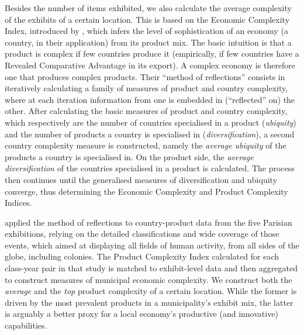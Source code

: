 Besides the number of items exhibited, we also calculate the average complexity of the exhibits of a certain location. 
This is based on the Economic Complexity Index, introduced by \cite{hidalgo2009}, which infers the level of sophistication of an economy (a country, in their application) from its product mix. 
The basic intuition is that a product is complex if few countries produce it (empirically, if few countries have a Revealed Comparative Advantage in its export). 
A complex economy is therefore one that produces complex products. 
Their ``method of reflections'' consists in iteratively calculating a family of measures of product and country complexity, where at each iteration information from one is embedded in (``reflected'' on) the other. 
After calculating the basic measures of product and country complexity, which respectively are the number of countries specialised in a product (\textit{ubiquity}) and the number of products a country is specialised in (\textit{diversification}), a second country complexity measure is constructed, namely the \textit{average ubiquity} of the products a country is specialised in. 
On the product side, the \textit{average diversification} of the countries specialised in a product is calculated. 
The process then continues until the generalised measures of diversification and ubiquity converge, thus determining the Economic Complexity and Product Complexity Indices. 

\citet{domini2022} applied the method of reflections to country-product data from the five Parisian exhibitions, relying on the detailed classifications and wide coverage of those events, which aimed at displaying all fields of human activity, from all sides of the globe, including colonies. 
The Product Complexity Index calculated for each class-year pair in that study is matched to exhibit-level data and then aggregated to construct measures of municipal economic complexity. 
We construct both the \textit{average} and the \textit{top} product complexity of a certain location. 
While the former is driven by the most prevalent products in a municipality's exhibit mix, the latter is arguably a better proxy for a local economy's productive (and innovative) capabilities.




